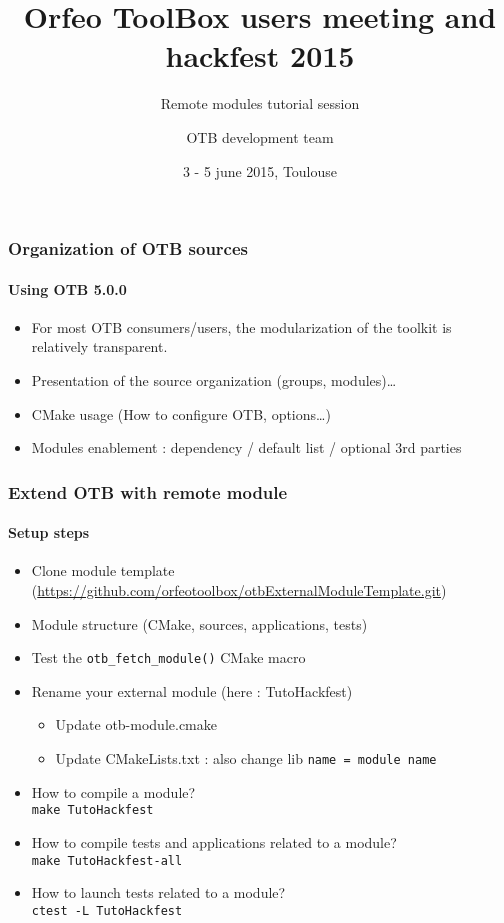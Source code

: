 \documentclass[8pt]{beamer}
\title{Orfeo ToolBox users meeting and hackfest 2015}
\subtitle{Remote modules tutorial session}
\author{OTB development team}%
\date{3 - 5 june 2015, Toulouse}
\begin{document}
\begin{frame}
\titlepage
\end{frame}

\begin{frame}
\frametitle{Organization of OTB sources}
\framesubtitle{Using OTB 5.0.0}

\begin{itemize}
\item For most OTB consumers/users, the modularization of the toolkit is relatively transparent. 
\item Presentation of the source organization (groups, modules)\ldots
\item CMake usage (How to configure OTB, options\ldots)
\item Modules enablement : dependency / default list / optional 3rd parties
\end{itemize}

\end{frame}

\begin{frame}
\frametitle{Extend OTB with remote module}
\framesubtitle{Setup steps}
\begin{itemize}
\item Clone module template (\url{https://github.com/orfeotoolbox/otbExternalModuleTemplate.git})
\item Module structure (CMake, sources, applications, tests)
\item Test the \texttt{otb\_fetch\_module()} CMake macro
\item Rename your external module (here : TutoHackfest)
  \begin{itemize}
  \item Update otb-module.cmake
  \item Update CMakeLists.txt : also change lib \texttt{name = module name}
  \end{itemize}
\item How to compile a module? \\ \texttt{make TutoHackfest}
\item How to compile tests and applications related to a module? \\ \texttt{make TutoHackfest-all}
\item How to launch tests related to a module? \\ \texttt{ctest -L TutoHackfest}
\end{itemize}

\end{frame}
\end{document}

